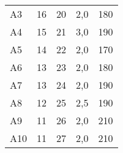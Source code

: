 \begin{table}[hbt!]
\begin{tabular}{@{} P{0.1\textwidth} *4{P{0.225\textwidth}} @{}}
		A3   & 16                                                                                      & 20                                                                                    & 2,0                                                                         & 180                                                                   \\ %
		A4   & 15                                                                                      & 21                                                                                    & 3,0                                                                         & 190                                                                   \\ %
		A5   & 14                                                                                      & 22                                                                                    & 2,0                                                                         & 170                                                                   \\ %
		A6   & 13                                                                                      & 23                                                                                    & 2,0                                                                         & 180                                                                   \\ %
		A7   & 13                                                                                      & 24                                                                                    & 2,0                                                                         & 190                                                                   \\ %
		A8   & 12                                                                                      & 25                                                                                    & 2,5                                                                         & 190                                                                   \\ %
		A9   & 11                                                                                      & 26                                                                                    & 2,0                                                                         & 210                                                                   \\ %
		A10  & 11                                                                                      & 27                                                                                    & 2,0                                                                         & 210                                                                   \\ \bottomrule
	\end{tabular}
	\label{tab:hslm_a_parameters}
\end{table}

